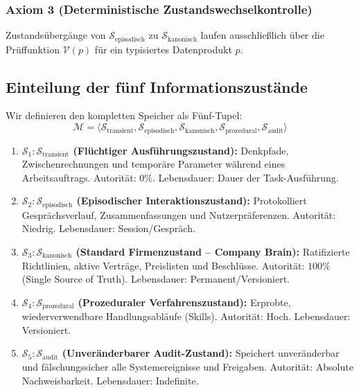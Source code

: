 \documentclass[10pt,journal,compsoc]{IEEEtran}
\begin{document}
\subsubsection{Axiom 3 (Deterministische Zustandswechselkontrolle)}
Zustandsübergänge von $\mathcal{S}_{\text{episodisch}}$ zu $\mathcal{S}_{\text{kanonisch}}$ laufen ausschließlich über die Prüffunktion $\mathcal{V}(p)$ für ein typisiertes Datenprodukt $p$.

\subsection{Einteilung der fünf Informationszustände}

Wir definieren den kompletten Speicher als Fünf-Tupel:
\begin{equation}
\mathcal{M} = \langle \mathcal{S}_{\text{transient}}, \mathcal{S}_{\text{episodisch}}, \mathcal{S}_{\text{kanonisch}}, \mathcal{S}_{\text{prozedural}}, \mathcal{S}_{\text{audit}} \rangle
\end{equation}

\begin{enumerate}
    \item \textbf{$\mathcal{S}_1: \mathcal{S}_{\text{transient}}$ (Flüchtiger Ausführungszustand):} Denkpfade, Zwischenrechnungen und temporäre Parameter während eines Arbeitsauftrags. Autorität: $0\%$. Lebensdauer: Dauer der Task-Ausführung.
    \item \textbf{$\mathcal{S}_2: \mathcal{S}_{\text{episodisch}}$ (Episodischer Interaktionszustand):} Protokolliert Gesprächsverlauf, Zusammenfassungen und Nutzerpräferenzen. Autorität: Niedrig. Lebensdauer: Session/Gespräch.
    \item \textbf{$\mathcal{S}_3: \mathcal{S}_{\text{kanonisch}}$ (Standard Firmenzustand -- Company Brain):} Ratifizierte Richtlinien, aktive Verträge, Preislisten und Beschlüsse. Autorität: $100\%$ (Single Source of Truth). Lebensdauer: Permanent/Versioniert.
    \item \textbf{$\mathcal{S}_4: \mathcal{S}_{\text{prozedural}}$ (Prozeduraler Verfahrenszustand):} Erprobte, wiederverwendbare Handlungsabläufe (Skills). Autorität: Hoch. Lebensdauer: Versioniert.
    \item \textbf{$\mathcal{S}_5: \mathcal{S}_{\text{audit}}$ (Unveränderbarer Audit-Zustand):} Speichert unveränderbar und fälschungssicher alle Systemereignisse und Freigaben. Autorität: Absolute Nachweisbarkeit. Lebensdauer: Indefinite.
\end{enumerate}
\end{document}
